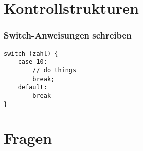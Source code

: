 \documentclass[mathserif]{beamer}
\begin{document}
\section{Kontrollstrukturen}

\begin{frame}[fragile]
\frametitle{Switch-Anweisungen schreiben}
\pause
    \begin{lstlisting}
switch (zahl) {
    case 10:
        // do things
        break;
    default:
        break
}

    \end{lstlisting}
\end{frame}

\section{Fragen}
\begin{frame}
    \pause
\end{frame}
\end{document}
